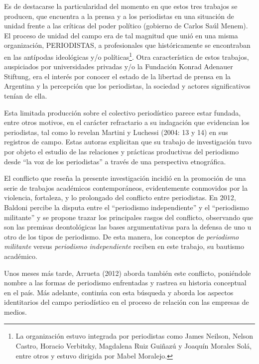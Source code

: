 Es de destacarse la particularidad del momento en que estos tres trabajos se producen, que encuentra a la prensa y a los periodistas en una situación de unidad frente a las críticas del poder político (gobierno de Carlos Saúl Menem). El proceso de unidad del campo era de tal magnitud que unió en una misma organización, PERIODISTAS, a profesionales que históricamente se encontraban en las antípodas ideológicas y/o políticas\footnote{La organización estuvo integrada por periodistas como James Neilson, Nelson Castro, Horacio Verbitsky, Magdalena Ruiz Guiñazú y Joaquín Morales Solá, entre otros y estuvo dirigida por Mabel Moralejo.}. Otra característica de estos trabajos, auspiciados por universidades privadas y/o la Fundación Konrad Adenauer Stiftung, era el interés por conocer el estado de la libertad de prensa en la Argentina y la percepción que los periodistas, la sociedad y actores significativos tenían de ella.

Esta limitada producción sobre el colectivo periodístico parece estar fundada, entre otros motivos, en el carácter refractario a su indagación que evidencian los periodistas, tal como lo revelan Martini y Luchessi (2004: 13 y 14) en sus registros de campo. Estas autoras explicitan que su trabajo de investigación tuvo por objeto el estudio de las relaciones y prácticas productivas del periodismo desde ``la voz de los periodistas'' a través de una perspectiva etnográfica.

El conflicto que reseña la presente investigación incidió en la promoción de una serie de trabajos académicos contemporáneos, evidentemente conmovidos por la violencia, fortaleza, y lo prolongado del conflicto entre periodistas. {En 2012, Baldoni} percibe la disputa entre el \enquote{periodismo independiente} y el \enquote{periodismo militante} y se propone trazar los principales rasgos del conflicto, observando que son las premisas deontológicas las bases argumentativas para la defensa de uno u otro de los tipos de periodismo. De esta manera, los conceptos de \emph{periodismo militante} versus \emph{periodismo independiente} reciben en este trabajo, su bautismo académico.

Unos meses más tarde, \textcite{@ARRUETA2013IDENTIDADES}{Arrueta (2012)} aborda también este conflicto, poniéndole nombre a las formas de periodismo enfrentadas  y rastrea su historia conceptual en el país. Más adelante, continúa con esta búsqueda y aborda los aspectos identitarios del campo periodístico en el proceso de relación con las empresas de medios.

